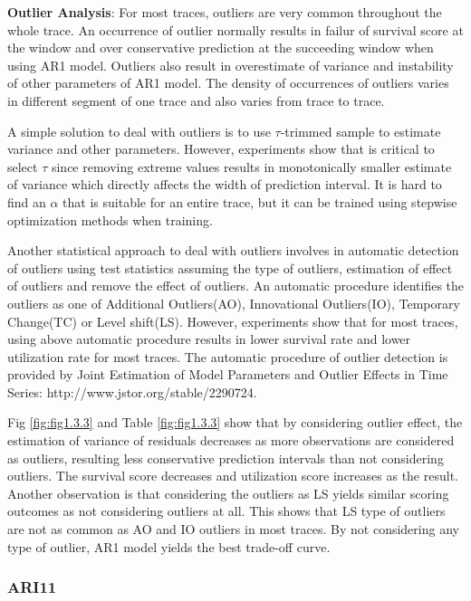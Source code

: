 \documentclass{article}
\begin{document}
\begin{flushleft}
\textbf{Outlier Analysis}: For most traces, outliers are very common throughout the whole trace. An occurrence of outlier normally results in failur of survival score at the window and over conservative prediction at the succeeding window when using AR1 model. Outliers also result in overestimate of variance and instability of other parameters of AR1 model. The density of occurrences of outliers varies in different segment of one trace and also varies from trace to trace.  

A simple solution to deal with outliers is to use $\tau$-trimmed sample to estimate variance and other parameters. However, experiments show that is critical to select $\tau$ since removing extreme values results in monotonically smaller estimate of variance which directly affects the width of prediction interval. It is hard to find an $\alpha$ that is suitable for an entire trace, but it can be trained using stepwise optimization methods when training.

Another statistical approach to deal with outliers involves in automatic detection of outliers using test statistics assuming the type of outliers, estimation of effect of outliers and remove the effect of outliers. An automatic procedure identifies the outliers as one of Additional Outliers(AO), Innovational Outliers(IO), Temporary Change(TC) or Level shift(LS). However, experiments show that for most traces, using above automatic procedure results in lower survival rate and lower utilization rate for most traces. The automatic procedure of outlier detection is provided by Joint Estimation of Model Parameters and Outlier Effects in Time Series: http://www.jstor.org/stable/2290724.

Fig \ref{fig:fig1.3.3} and Table \ref{fig:fig1.3.3} show that by considering outlier effect, the estimation of variance of residuals decreases as more observations are considered as outliers, resulting less conservative prediction intervals than not considering outliers. The survival score decreases and utilization score increases as the result. Another observation is that considering the outliers as LS yields similar scoring outcomes as not considering outliers at all. This shows that LS type of outliers are not as common as AO and IO outliers in most traces. By not considering any type of outlier, AR1 model yields the best trade-off curve.
\end{flushleft}

\subsubsection{ARI11}
\end{document}
